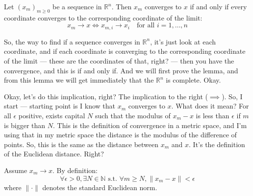 \begin{nice-box}
\setcounter{theorem}{25}
\begin{lemma}\label{lem:coordinate-convergence}
Let $(x_m)_{m \ge 0}$ be a sequence in $\mathbb{R}^n$. Then $x_m$ converges to $x$ if and only if every coordinate converges to the corresponding coordinate of the limit:
\[ x_m \to x \iff x_{m,i} \to x_i \quad \text{for all } i = 1, \dots, n \]
\end{lemma}
\end{nice-box}

\begin{spoken-clean}[00:15:51 - 00:17:20]
So, the way to find if a sequence converges in $\mathbb{R}^n$, it's just look at each coordinate, and if each coordinate is converging to the corresponding coordinate of the limit --- these are the coordinates of that, right? --- then you have the convergence, and this is if and only if. And we will first prove the lemma, and from this lemma we will get immediately that the $\mathbb{R}^n$ is complete. Okay.
\end{spoken-clean}

\begin{spoken-clean}[00:17:21 - 00:18:42]
Okay, let's do this implication, right? The implication to the right ($\implies$). So, I start --- starting point is I know that $x_m$ converges to $x$. What does it mean?  For all $\epsilon$ positive, exists capital $N$ such that the modulus of $x_m - x$ is less than $\epsilon$ if $m$ is bigger than $N$. This is the definition of convergence in a metric space, and I'm using that in my metric space the distance is the modulus of the difference of points. So, this is the same as the distance between $x_m$ and $x$. It's the definition of the Euclidean distance. Right?
\end{spoken-clean}

\begin{math-stroke}[Proof: Implication \texorpdfstring{$\implies$}{=>}]
Assume $x_m \to x$. By definition:
\[ \forall \epsilon > 0, \exists N \in \mathbb{N} \text{ s.t. } \forall m \ge N, \|x_m - x\| < \epsilon \]
where $\| \cdot \|$ denotes the standard Euclidean norm.
\end{math-stroke}


